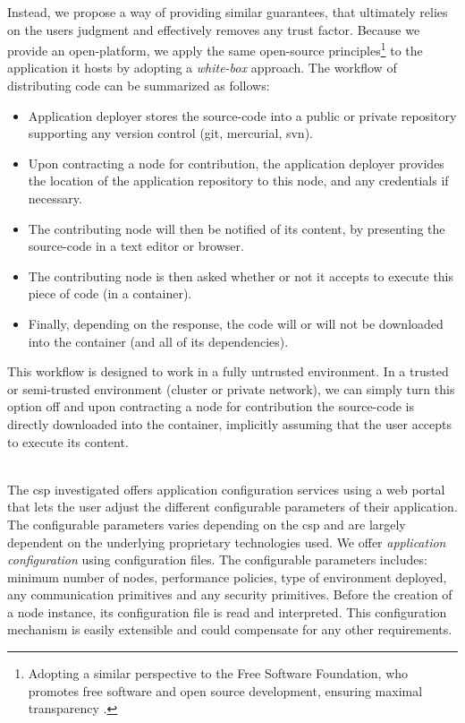\documentclass[12pt, titlepage]{uo_temp}
\begin{document}
     Instead, we propose a way of providing similar guarantees, that ultimately relies on
     the users judgment and effectively removes any trust factor. Because we provide an
     open-platform, we apply the same open-source principles\footnote{Adopting a similar
       perspective to the Free Software Foundation, who promotes free software and open
       source development, ensuring maximal transparency \cite{fsf}.} to the application it
     hosts by adopting a \emph{white-box} approach. The workflow of distributing code can
     be summarized as follows:
     \begin{itemize}
       \item Application deployer stores the source-code into a public or private
         repository supporting any version control (git, mercurial, svn).
       \item Upon contracting a node for contribution, the application deployer provides
         the location of the application repository to this node, and any credentials if necessary.
       \item The contributing node will then be notified of its content, by presenting the
         source-code in a text editor or browser.
       \item The contributing node is then asked whether or not it accepts to execute this
         piece of code (in a container).
       \item Finally, depending on the response, the code will or will not be downloaded
         into the container (and all of its dependencies).
     \end{itemize}
     This workflow is designed to work in a fully untrusted environment. In a trusted or
     semi-trusted environment (cluster or private network), we can simply turn this option
     off and upon contracting a node for contribution the source-code is directly
     downloaded into the container, implicitly assuming that the user accepts to execute
     its content.

     \\ The \gls{csp} investigated offers application configuration services using a web
     portal that lets the user adjust the different configurable parameters of their
     application. The configurable parameters varies depending on the \gls{csp} and are
     largely dependent on the underlying proprietary technologies used. We offer
     \emph{application configuration} using configuration files. The configurable
     parameters includes: minimum number of nodes, performance policies, type of
     environment deployed, any communication primitives and any security
     primitives. Before the creation of a node instance, its configuration file is read
     and interpreted. This configuration mechanism is easily extensible and could
     compensate for any other requirements.
\end{document}
